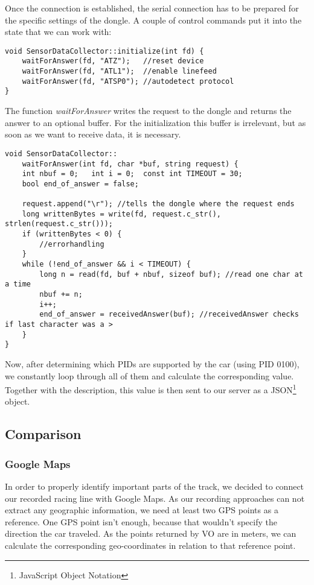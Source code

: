 Once the connection is established, the serial connection has to be prepared for the specific settings of the dongle.
A couple of control commands put it into the state that we can work with: 

\begin{lstlisting}
void SensorDataCollector::initialize(int fd) {
	waitForAnswer(fd, "ATZ");	//reset device
	waitForAnswer(fd, "ATL1");	//enable linefeed
	waitForAnswer(fd, "ATSP0");	//autodetect protocol
}
\end{lstlisting}
The function \textit{waitForAnswer} writes the request to the dongle and returns the answer to an optional buffer. For the initialization this buffer is irrelevant, but as soon as we want to receive data, it is necessary.
\begin{lstlisting}
void SensorDataCollector::
	waitForAnswer(int fd, char *buf, string request) {
	int nbuf = 0; 	int i = 0;	const int TIMEOUT = 30;
	bool end_of_answer = false;

	request.append("\r"); //tells the dongle where the request ends
	long writtenBytes = write(fd, request.c_str(), strlen(request.c_str()));
	if (writtenBytes < 0) {
		//errorhandling
	}
	while (!end_of_answer && i < TIMEOUT) {
		long n = read(fd, buf + nbuf, sizeof buf); //read one char at a time
		nbuf += n;
		i++;
		end_of_answer = receivedAnswer(buf); //receivedAnswer checks if last character was a >
	}
}
\end{lstlisting}

Now, after determining which PIDs are supported by the car (using PID 0100), we constantly loop through all of them and calculate the corresponding value. Together with the description, this value is then sent to our server as a JSON\footnote{JavaScript Object Notation} object.

\subsection{Comparison}
\subsubsection{Google Maps}
In order to properly identify important parts of the track, we decided to connect our recorded racing line with Google Maps. As our recording approaches can not extract any geographic information, we need at least two GPS points as a reference. One GPS point isn't enough, because that wouldn't specify the direction the car traveled. As the points returned by VO are in meters, we can calculate the corresponding geo-coordinates in relation to that reference point. 

